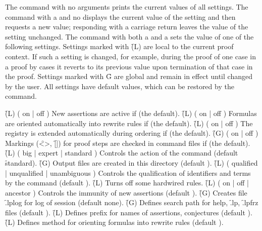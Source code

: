 The  command with no arguments prints the current values of all
settings.  The  command with a  and no
 displays the current value of the setting and then requests
a new value; responding with a carriage return leaves the value of the setting
unchanged.   The  command with both a  and a
 sets the value of one of the following settings.
\p
Settings marked with \f{(L)} are local to the current proof context.  If such a
setting is changed, for example, during the proof of one case in a proof by
cases it reverts to its previous value upon termination of that case in the
proof.  Settings marked with \f{G} are global and remain in effect until
changed by the user.  All settings have default values, which can be restored
by the  command.
\begin{description}
\dt \f{(L)  ( on | off )}
\dd 
New assertions are active if  (the default).
\dt \f{(L)  ( on | off )}
\dd 
Formulas are oriented automatically into rewrite rules if  (the
default).
\dt \f{(L)  ( on | off )}
\dd 
The registry is extended automatically during ordering if  (the
default).
\dt \f{(G)  ( on | off )}
\dd 
Markings (\f{<>}, \f{[]}) for proof steps are checked in command files if
 (the default).
\dt \f{(L)  ( big | expert | standard )}
\dd 
Controls the action of the  command (default \f{standard}).
\dt \f{(G)  }
\dd 
Output files are created in this directory (default ).
\dt \f{(L)  ( qualified | unqualified | unambiguous )}
\dd 
Controls the qualification of identifiers and terms by the  command
(default ).
\dt \f{(L)  }
\dd
Turns off some hardwired rules.
\dt \f{(L)  ( on | off | ancestor )}
\dd
Controls the immunity of new assertions (default ).
\dt \f{(G)  }
\dd
Creates file \f{.lplog} for log of session (default none).
\dt \f{(G)  }
\dd
Defines search path for help, \f{.lp}, \f{.lpfrz} files (default ).
\dt \f{(L)  }
\dd
Defines prefix for names of assertions, conjectures (default ).
\dt \f{(L)  }
\dd
Defines method for orienting formulas into rewrite rules (default ).

\end{description}
